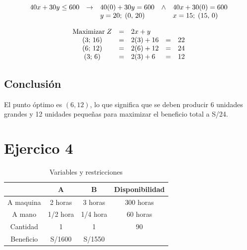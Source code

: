 \documentclass[12pt]{article}
\begin{document}
\[
\begin{array}{l l l l l l l}
40x + 30y \leq 600 & \rightarrow & 40(0) + 30y = 600  & \wedge & 40x + 30(0) = 600   \\
                   &             & y = 20;\; (0,\,20) &        & x = 15;\; (15,\,0)  \\
\end{array}
\]

\vspace{0.5cm}

\[
\begin{array}{c c l c l}
\text{Maximizar}\;Z & = & 2x + y    &   &    \\
(3;\, 16)           & = & 2(3) + 16 & = & 22 \\
(6;\, 12)           & = & 2(6) + 12 & = & 24 \\
(3;\, 6)            & = & 2(3) + 6  & = & 12 \\
\end{array}
\]

\subsection*{Conclusión}
El punto óptimo es $(6, 12)$, lo que significa que se deben producir 6 unidades grandes y 12 unidades pequeñas para maximizar el beneficio total a S/24.





\newpage
\section*{Ejercico 4}
\begin{table}[h]
    \centering
    \begin{tabular}{|c|c|c|c|}
    \hline
              & A        & B        & Disponibilidad \\ \hline
    A maquina & 2 horas  & 3 horas  & 300 horas      \\ \hline
    A mano    & 1/2 hora & 1/4 hora & 60 horas       \\ \hline
    Cantidad  & 1        & 1        & 90             \\ \hline
    Beneficio & S/1600   & S/1550   &                \\ \hline
    \end{tabular}
    \caption{Variables y restricciones}
    \label{tab:Ejercicio4}
\end{table}
\end{document}
